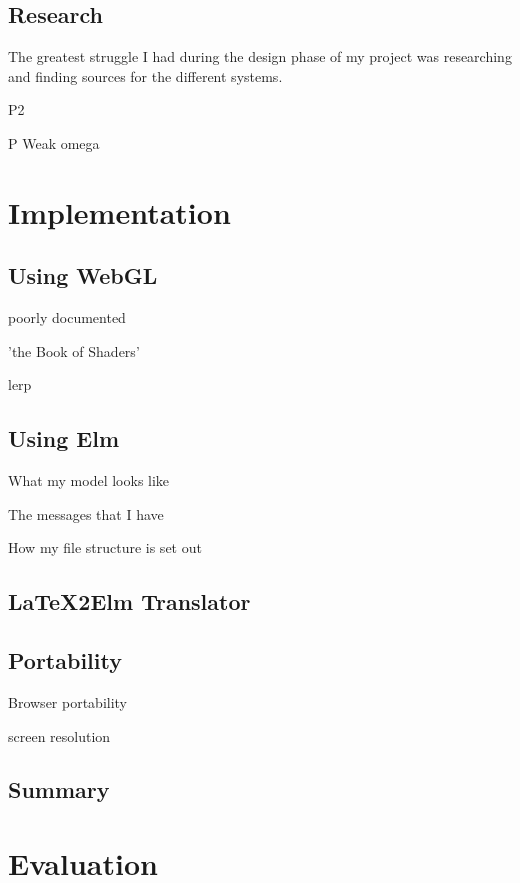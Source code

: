 \documentclass{l4proj}
\begin{document}
\section{Research}

The greatest struggle I had during the design phase of my project was researching and finding sources for the different systems.

P2

P Weak omega


\chapter{Implementation}


\section{Using WebGL}

poorly documented

'the Book of Shaders'

lerp

\section{Using Elm}

What my model looks like

The messages that I have

How my file structure is set out

\section{LaTeX2Elm Translator}

\section{Portability}

Browser portability

screen resolution

\section{Summary}


\chapter{Evaluation} 
\end{document}
